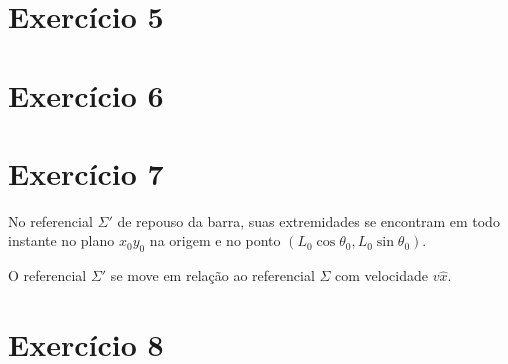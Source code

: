\documentclass[12pt,a4paper]{article}
\numberwithin{equation}{section}
\begin{document}
\section*{Exercício 5}
\section*{Exercício 6}
\section*{Exercício 7}
No referencial \(\Sigma'\) de repouso da barra, suas extremidades se encontram em todo instante no plano \(x_0y_0\) na origem e no ponto \((L_0 \cos\theta_0, L_0 \sin \theta_0)\).

O referencial \(\Sigma'\) se move em relação ao referencial \(\Sigma\) com velocidade \(v\hat{x}\).

\section*{Exercício 8}
\end{document}
